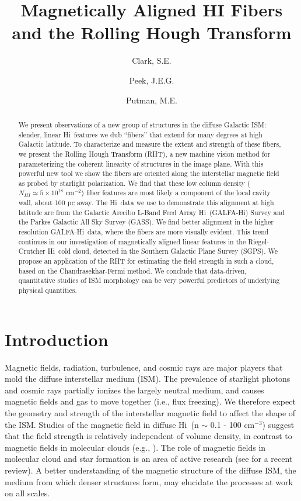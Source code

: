 \documentclass[12pt]{emulateapj}
\newcommand{\hi}{H{\sc i}~}
\newcommand{\hia}{H{\sc i}}
\newcommand{\citei}[1]{\citeauthor{#1} \citeyear{#1}}
\begin{document}
\title{Magnetically Aligned HI Fibers and the Rolling Hough Transform}
\author{Clark, S.E.}
\author{Peek, J.E.G.}
\author{Putman, M.E.}



\begin{abstract}
We present observations of a new group of structures in the diffuse Galactic ISM: slender, linear \hi features we dub ``fibers'' that extend for many degrees at high Galactic latitude. To characterize and measure the extent and strength of these fibers, we present the Rolling Hough Transform (RHT), a new machine vision method for parameterizing the coherent linearity of structures in the image plane. With this powerful new tool we show the fibers are oriented along the interstellar magnetic field as probed by starlight polarization. We find that these low column density ($N_{HI} \simeq  5 \times 10^{18}$ cm$^{-2}$) fiber features are most likely a component of the local cavity wall, about 100 pc away. The \hi data we use to demonstrate this alignment at high latitude are from the Galactic Arecibo L-Band Feed Array \hi (GALFA-\hia) Survey and the Parkes Galactic All Sky Survey (GASS). We find better alignment in the higher resolution GALFA-\hi data, where the fibers are more visually evident. This trend continues in our investigation of magnetically aligned linear features in the Riegel-Crutcher \hi cold cloud, detected in the Southern Galactic Plane Survey (SGPS). We propose an application of the RHT for estimating the field strength in such a cloud, based on the Chandrasekhar-Fermi method. We conclude that data-driven, quantitative studies of ISM morphology can be very powerful predictors of underlying physical quantities.
\end{abstract}



\section{Introduction}

Magnetic fields, radiation, turbulence, and cosmic rays are major players that mold the diffuse interstellar medium (ISM). The prevalence of starlight photons and cosmic rays partially ionizes the largely neutral medium, and causes magnetic fields and gas to move together (i.e., flux freezing). We therefore expect the geometry and strength of the interstellar magnetic field to affect the shape of the ISM. Studies of the magnetic field in diffuse \hi (n ${\sim}$ 0.1 - 100 cm${^{-3}}$) suggest that the field strength is relatively independent of volume density, in contrast to magnetic fields in molecular clouds (e.g., \citei{Heiles:2005tb}). The role of magnetic fields in molecular cloud and star formation is an area of active research (see \citei{Crutcher:2012hw} for a recent review). A better understanding of the magnetic structure of the diffuse ISM, the medium from which denser structures form, may elucidate the processes at work on all scales. 
\end{document}
